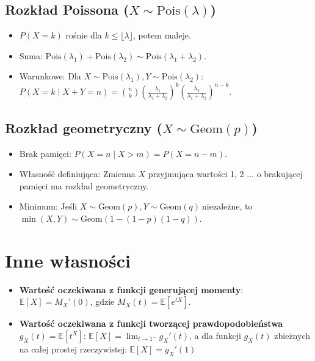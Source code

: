 \documentclass{article}
\theoremstyle{definition}
\theoremstyle{remark}
\begin{document}
\begin{multicols}{2}
    \subsection*{Rozkład Poissona (\( X \sim \text{Pois}(\lambda) \))}
    \begin{itemize}[itemsep=0pt, left=0pt]
        \item \( P(X=k) \) rośnie dla \( k \leq \lfloor \lambda \rfloor \), potem maleje.
        \item Suma: \( \text{Pois}(\lambda_1) + \text{Pois}(\lambda_2) \sim \text{Pois}(\lambda_1+\lambda_2) \).
        \item Warunkowe: Dla \( X \sim \text{Pois}(\lambda_1), Y \sim \text{Pois}(\lambda_2) \): \\
        \(
        P(X=k \mid X+Y=n) = \binom{n}{k} \left(\frac{\lambda_1}{\lambda_1+\lambda_2}\right)^k \left(\frac{\lambda_2}{\lambda_1+\lambda_2}\right)^{n-k}.
        \)
    \end{itemize}
    
    \subsection*{Rozkład geometryczny (\( X \sim \text{Geom}(p) \))}
    \begin{itemize}[itemsep=0pt, left=0pt]
        \item Brak pamięci: \( P(X=n \mid X>m) = P(X=n-m) \).
        \item Własność definiująca: Zmienna \( X \) przyjmująca wartości 1, 2 \(\ldots\)  o brakującej pamięci ma rozkład geometryczny.
        \item Minimum: Jeśli \( X \sim \text{Geom}(p), Y \sim \text{Geom}(q) \ \text{niezależne} \), to \( \min(X, Y) \sim \text{Geom}(1-(1-p)(1-q)) \).
    \end{itemize}
    
    \section*{Inne własności}
    \begin{itemize}
    
    \item \textbf{Wartość oczekiwana z funkcji generującej momenty}: \(\mathbb{E}[X] = M_X'(0)\), gdzie \( M_X(t) = \mathbb{E}[e^{tX}] \).
    
    \item \textbf{Wartość oczekiwana z funkcji tworzącej prawdopodobieństwa} \( g_X(t) = \mathbb{E}[t^X] \): \(\mathbb{E}[X] = \lim_{t \to 1^-} g_X'(t)\), 
    a dla funkcji \( g_X(t) \) zbieżnych na całej prostej rzeczywistej: \(\mathbb{E}[X] = g_X'(1)\)
    

\end{itemize}
\end{multicols}
\end{document}
